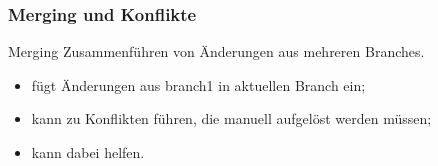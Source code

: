 \documentclass{cms-kurs}
\begin{document}
\begin{frame}
  \frametitle{Merging und Konflikte}

  \onslide<+->

  \begin{block}{Merging}
    Zusammenführen von Änderungen aus mehreren Branches.
  \end{block}

  \onslide<+->

  \begin{itemize}
  \item {} fügt Änderungen aus branch1 in aktuellen Branch
    ein;
  \item kann zu Konflikten führen, die manuell aufgelöst werden müssen;
  \item {} kann dabei helfen.
  \end{itemize}

\end{frame}
\end{document}
